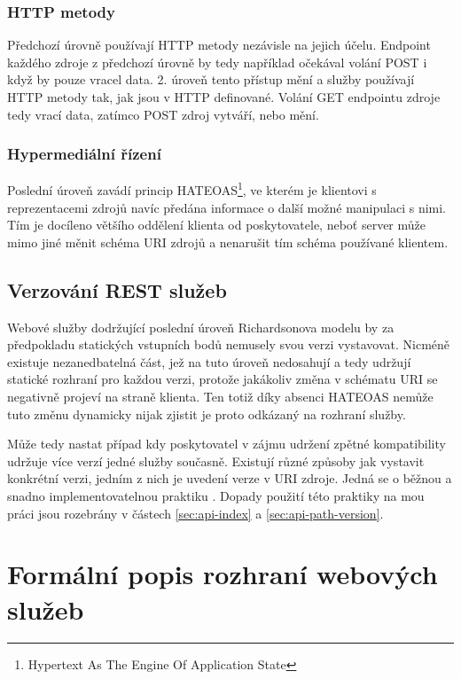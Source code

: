 \documentclass[czech,DP]{thesiskiv}
\begin{document}
\subsubsection{HTTP metody}
Předchozí úrovně používají HTTP metody nezávisle na jejich účelu. Endpoint každého zdroje z předchozí úrovně by tedy například očekával volání POST i když by pouze vracel data. 2. úroveň tento přístup mění a služby používají HTTP metody tak, jak jsou v HTTP definované. Volání GET endpointu zdroje tedy vrací data, zatímco POST zdroj vytváří, nebo mění. 

\subsubsection{Hypermediální řízení}
Poslední úroveň zavádí princip HATEOAS\footnote{Hypertext As The Engine Of Application State}, ve kterém je klientovi s reprezentacemi zdrojů navíc předána informace o další možné manipulaci s nimi. Tím je docíleno většího oddělení klienta od poskytovatele, neboť server může mimo jiné měnit schéma URI zdrojů a nenarušit tím schéma používané klientem.

\subsection{Verzování REST služeb}

Webové služby dodržující poslední úroveň Richardsonova modelu by za předpokladu statických vstupních bodů nemusely svou verzi vystavovat. Nicméně existuje nezanedbatelná část, jež na tuto úroveň nedosahují a tedy udržují statické rozhraní pro každou verzi, protože jakákoliv změna v schématu URI se negativně projeví na straně klienta. Ten totiž díky absenci HATEOAS nemůže tuto změnu dynamicky nijak zjistit je proto odkázaný na rozhraní služby. 

Může tedy nastat případ kdy poskytovatel v zájmu udržení zpětné kompatibility udržuje více verzí jedné služby současně. Existují různé způsoby jak vystavit konkrétní verzi, jedním z nich je uvedení verze v URI zdroje. Jedná se o běžnou a snadno implementovatelnou praktiku \cite{restApiVersion}\cite{restfulWebServices}. Dopady použití této praktiky na mou práci jsou rozebrány v částech \ref{sec:api-index} a \ref{sec:api-path-version}.


\section{Formální popis rozhraní webových služeb}
\label{sec:api-description-formats}
\end{document}
